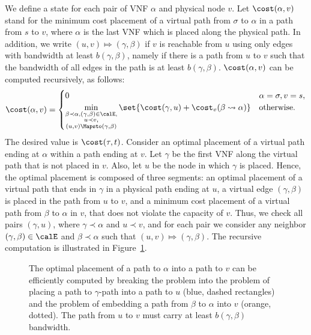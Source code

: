 We define a state for each pair of VNF $\alpha$ and physical node $v$.
Let $\cost(\alpha,v)$ stand for the minimum cost placement of a
virtual path from $\sigma$ to $\alpha$ in a path from $s$ to $v$,
where $\alpha$ is the last VNF which is placed along the physical
path.
%
In addition, we write $(u, v) \Mapsto (\gamma,\beta)$ if $v$ is
reachable from $u$ using only edges with bandwidth at least
$b(\gamma,\beta)$, namely if there is a path from $u$ to $v$ such that
the bandwidth of all edges in the path is at least $b(\gamma,\beta)$.
%
$\cost(\alpha,v)$ can be computed recursively, as follows:
\[
\cost(\alpha,v) =
\begin{cases}
0 & \alpha = \sigma, v = s, \\
\displaystyle
\min_{
  \substack{\beta \prec \alpha, (\gamma,\beta) \in \calE, \\
           u \prec v, \\
         (u,v) \Mapsto (\gamma,\beta)}
     }
  \set{\cost(\gamma,u) + \cost_v(\beta \leadsto \alpha)}
  & \text{otherwise}.
\end{cases}
\]
The desired value is $\cost(\tau,t)$.
%
Consider an optimal placement of a virtual path ending at $\alpha$
within a path ending at $v$.  Let $\gamma$ be the first VNF along the
virtual path that is not placed in $v$.  Also, let $u$ be the node in
which $\gamma$ is placed.  Hence, the optimal placement is composed of
three segments: an optimal placement of a virtual path that ends in
$\gamma$ in a physical path ending at $u$, a virtual edge
$(\gamma,\beta)$ is placed in the path from $u$ to $v$, and a minimum
cost placement of a virtual path from $\beta$ to $\alpha$ in $v$, that
does not violate the capacity of $v$.
%
Thus, we check all pairs $(\gamma,u)$, where $\gamma \prec \alpha$ and
$u \prec v$, and for each pair we consider any neighbor
$(\gamma,\beta) \in \calE$ and $\beta \prec \alpha$ such that $(u, v)
\Mapsto (\gamma,\beta)$.
%
The recursive computation is illustrated in Figure~\ref{fig:dp1}.

\begin{figure}[t]
\centering
{}
\caption{The optimal placement of a path to $\alpha$ into a path to
  $v$ can be efficiently computed by breaking the problem into the
  problem of placing a path to $\gamma$-path into a path to $u$ (blue,
  dashed rectangles) and the problem of embedding a path from $\beta$
  to $\alpha$ into $v$ (orange, dotted).  The path from $u$ to $v$
  must carry at least $b(\gamma,\beta)$ bandwidth.  }
\label{fig:dp1}
\end{figure}

